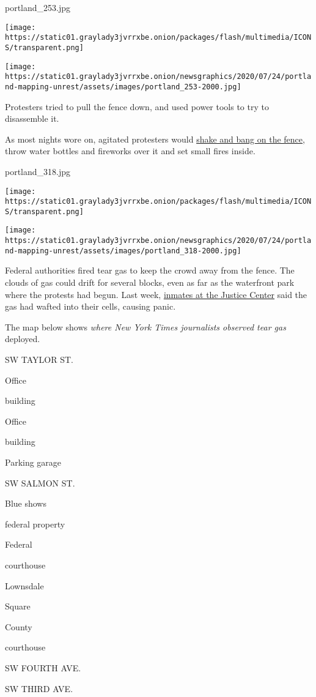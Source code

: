 portland\_253.jpg

\texttt{[image: https://static01.graylady3jvrrxbe.onion/packages/flash/multimedia/ICONS/transparent.png]}

\texttt{[image: https://static01.graylady3jvrrxbe.onion/newsgraphics/2020/07/24/portland-mapping-unrest/assets/images/portland\_253-2000.jpg]}

Protesters tried to pull the fence down, and used power tools to try to
disassemble it.

As most nights wore on, agitated protesters would
\href{https://www.youtube.com/watch?v=XqebTNY6cI0}{shake and bang on the
fence}, throw water bottles and fireworks over it and set small fires
inside.

portland\_318.jpg

\texttt{[image: https://static01.graylady3jvrrxbe.onion/packages/flash/multimedia/ICONS/transparent.png]}

\texttt{[image: https://static01.graylady3jvrrxbe.onion/newsgraphics/2020/07/24/portland-mapping-unrest/assets/images/portland\_318-2000.jpg]}

Federal authorities fired tear gas to keep the crowd away from the
fence. The clouds of gas could drift for several blocks, even as far as
the waterfront park where the protests had begun. Last week,
\href{https://www.oregonlive.com/crime/2020/07/downtown-jail-inmates-hitting-panic-buttons-due-to-tear-gas-wafting-into-cells-lawyers-say.html}{inmates
at the Justice Center} said the gas had wafted into their cells, causing
panic.

The map below shows \emph{where New York Times journalists observed tear
gas} deployed.

SW TAYLOR ST.

Office

building

Office

building

Parking garage

SW SALMON ST.

Blue shows

federal property

Federal

courthouse

Lownsdale

Square

County

courthouse

SW FOURTH AVE.

SW THIRD AVE.

